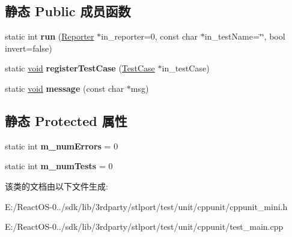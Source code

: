 \subsection*{静态 Public 成员函数}
\begin{DoxyCompactItemize}
\item 
\mbox{\label{class_test_case_a3f1a68ea28735604f983c4a89a4084f8}} 
static int {\bfseries run} (\hyperlink{class_reporter}{Reporter} $\ast$in\+\_\+reporter=0, const char $\ast$in\+\_\+test\+Name=\char`\"{}\char`\"{}, bool invert=false)
\item 
\mbox{\label{class_test_case_acfd59e4cc6c5638d90e5001f218788a9}} 
static \hyperlink{interfacevoid}{void} {\bfseries register\+Test\+Case} (\hyperlink{class_test_case}{Test\+Case} $\ast$in\+\_\+test\+Case)
\item 
\mbox{\label{class_test_case_a0315be29b9546ca7eead8f9c484b8fb7}} 
static \hyperlink{interfacevoid}{void} {\bfseries message} (const char $\ast$msg)
\end{DoxyCompactItemize}
\subsection*{静态 Protected 属性}
\begin{DoxyCompactItemize}
\item 
\mbox{\label{class_test_case_aed5f2383d17ca803811986ec91a05eda}} 
static int {\bfseries m\+\_\+num\+Errors} = 0
\item 
\mbox{\label{class_test_case_a4d10428de36df5d24414a00be57de975}} 
static int {\bfseries m\+\_\+num\+Tests} = 0
\end{DoxyCompactItemize}


该类的文档由以下文件生成\+:\begin{DoxyCompactItemize}
\item 
E\+:/\+React\+O\+S-\/0../sdk/lib/3rdparty/stlport/test/unit/cppunit/cppunit\+\_\+mini.\+h\item 
E\+:/\+React\+O\+S-\/0../sdk/lib/3rdparty/stlport/test/unit/cppunit/test\+\_\+main.\+cpp\end{DoxyCompactItemize}
